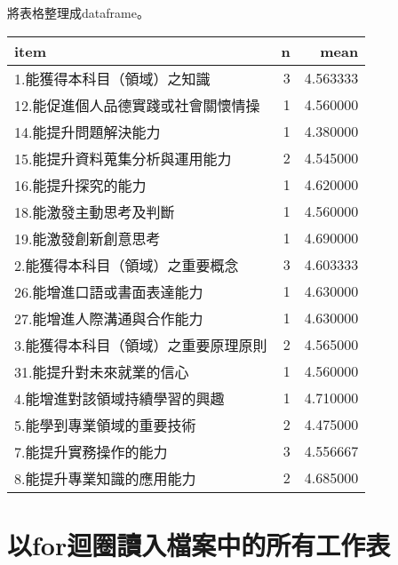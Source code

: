 \documentclass[
]{book}
\newenvironment{Shaded}{\begin{snugshade}}{\end{snugshade}}
\newcommand{\FloatTok}[1]{\textcolor[rgb]{0.00,0.00,0.81}{#1}}
\newcommand{\FunctionTok}[1]{\textcolor[rgb]{0.00,0.00,0.00}{#1}}
\newcommand{\NormalTok}[1]{#1}
\newcommand{\OtherTok}[1]{\textcolor[rgb]{0.56,0.35,0.01}{#1}}
\newcommand{\SpecialCharTok}[1]{\textcolor[rgb]{0.00,0.00,0.00}{#1}}
\newcommand{\StringTok}[1]{\textcolor[rgb]{0.31,0.60,0.02}{#1}}
\begin{document}
將表格整理成dataframe。

\begin{Shaded}
\end{Shaded}

\begin{tabular}{l|r|r}
\hline
item & n & mean\\
\hline
1.能獲得本科目（領域）之知識 & 3 & 4.563333\\
\hline
12.能促進個人品德實踐或社會關懷情操 & 1 & 4.560000\\
\hline
14.能提升問題解決能力 & 1 & 4.380000\\
\hline
15.能提升資料蒐集分析與運用能力 & 2 & 4.545000\\
\hline
16.能提升探究的能力 & 1 & 4.620000\\
\hline
18.能激發主動思考及判斷 & 1 & 4.560000\\
\hline
19.能激發創新創意思考 & 1 & 4.690000\\
\hline
2.能獲得本科目（領域）之重要概念 & 3 & 4.603333\\
\hline
26.能增進口語或書面表達能力 & 1 & 4.630000\\
\hline
27.能增進人際溝通與合作能力 & 1 & 4.630000\\
\hline
3.能獲得本科目（領域）之重要原理原則 & 2 & 4.565000\\
\hline
31.能提升對未來就業的信心 & 1 & 4.560000\\
\hline
4.能增進對該領域持續學習的興趣 & 1 & 4.710000\\
\hline
5.能學到專業領域的重要技術 & 2 & 4.475000\\
\hline
7.能提升實務操作的能力 & 3 & 4.556667\\
\hline
8.能提升專業知識的應用能力 & 2 & 4.685000\\
\hline
\end{tabular}

\hypertarget{ux4ee5forux8ff4ux5708ux8b80ux5165ux6a94ux6848ux4e2dux7684ux6240ux6709ux5de5ux4f5cux8868}{%
\section{以for迴圈讀入檔案中的所有工作表}\label{ux4ee5forux8ff4ux5708ux8b80ux5165ux6a94ux6848ux4e2dux7684ux6240ux6709ux5de5ux4f5cux8868}}
\end{document}
